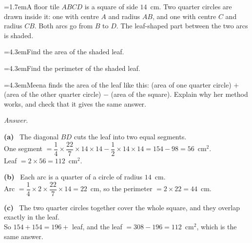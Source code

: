 \documentclass[11pt,a4paper]{article}
\newcommand{\nl}{\\[3pt]}
\newcounter{qn}
\newcommand{\ques}{\par\medskip\refstepcounter{qn}\noindent\hangindent=1.7em\hangafter=1\makebox[1.7em][l]{\textbf{\arabic{qn}.}}\ignorespaces}
\newcommand{\pc}[2]{\par\smallskip\noindent\hspace*{2em}\hangindent=4.3em\hangafter=1\makebox[2em][l]{(#1)}\hspace{0.3em}#2\par}
\newenvironment{answerblock}
  {\par\needspace{6\baselineskip}\smallskip\begingroup\small\linespread{1.2}\selectfont\color{muted}\noindent\textit{Answer.}\par}
  {\par\endgroup\medskip}
\newcommand{\ap}[1]{\par\smallskip\noindent\textbf{(#1)}\ }
\begin{document}
\ques A floor tile $ABCD$ is a square of side $14$~cm. Two quarter circles are drawn inside it: one with centre $A$ and radius $AB$, and one with centre $C$ and radius $CB$. Both arcs go from $B$ to $D$. The leaf-shaped part between the two arcs is shaded.\par
\pc{a}{Find the area of the shaded leaf.}
\pc{b}{Find the perimeter of the shaded leaf.}
\pc{c}{Meena finds the area of the leaf like this: (area of one quarter circle) $+$ (area of the other quarter circle) $-$ (area of the square). Explain why her method works, and check that it gives the same answer.}
\begin{center}
\end{center}
\begin{answerblock}
\ap{a} The diagonal $BD$ cuts the leaf into two equal segments.\nl
One segment $=\dfrac14\times\dfrac{22}{7}\times14\times14-\dfrac12\times14\times14=154-98=56$~cm$^2$.\nl
Leaf $=2\times56=112$~cm$^2$.
\ap{b} Each arc is a quarter of a circle of radius $14$~cm.\nl
Arc $=\dfrac14\times2\times\dfrac{22}{7}\times14=22$~cm, so the perimeter $=2\times22=44$~cm.
\ap{c} The two quarter circles together cover the whole square, and they overlap exactly in the leaf.\nl
So $154+154=196+$ leaf, and the leaf $=308-196=112$~cm$^2$, which is the same answer.
\begin{center}
\end{center}
\end{answerblock}
\end{document}

